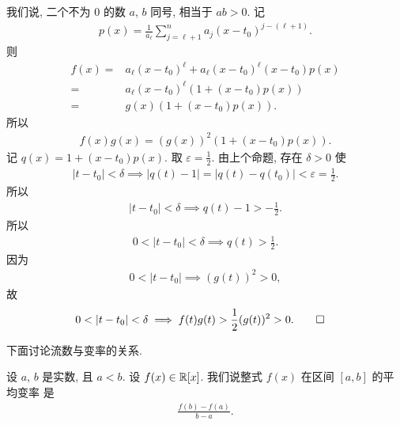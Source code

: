 \begin{pf}
    我们说, 二个不为 $0$ 的数 $a$, $b$ 同号, 相当于 $ab > 0$. 记
    \begin{align*}
        p(x) = \frac{1}{a_\ell} \sum_{j = \ell + 1}^{n} a_j (x - t_0)^{j - (\ell + 1)}.
    \end{align*}
    则
    \begin{align*}
        f(x)
        = {} & a_\ell (x - t_0)^\ell + a_\ell (x - t_0)^{\ell} (x - t_0) p(x) \\
        = {} & a_\ell (x - t_0)^\ell (1 + (x - t_0) p(x))                     \\
        = {} & g(x) (1 + (x - t_0) p(x)).
    \end{align*}
    所以
    \begin{align*}
        f(x) g(x) = (g(x))^2 (1 + (x - t_0) p(x)).
    \end{align*}
    记 $q(x) = 1 + (x - t_0) p(x)$. 取 $\varepsilon = \frac12$. 由上个命题, 存在 $\delta > 0$ 使
    \begin{align*}
        |t - t_0| < \delta \implies |q(t) - 1| = |q(t) - q(t_0)| < \varepsilon = \frac12.
    \end{align*}
    所以
    \begin{align*}
        |t - t_0| < \delta \implies q(t) - 1 > -\frac12.
    \end{align*}
    所以
    \begin{align*}
        0 < |t - t_0| < \delta \implies q(t) > \frac12.
    \end{align*}
    因为
    \begin{align*}
        0 < |t - t_0| \implies (g(t))^2 > 0,
    \end{align*}
    故
    \begin{align*}
         & 0 < |t - t_0| < \delta \implies f(t) g(t) > \frac12 (g(t))^2 > 0. \qedhere
    \end{align*}
\end{pf}

下面讨论流数与变率的关系.

\begin{definition}
    设 $a$, $b$ 是实数, 且 $a < b$. 设 $f(x) \in \mathbb{R}[x]$. 我们说整式 $f(x)$ 在区间 $[a, b]$ 的平均变率  是
    \begin{align*}
        \frac{f(b) - f(a)}{b - a}.
    \end{align*}
\end{definition}

